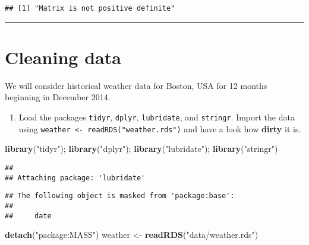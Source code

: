\documentclass[]{article}
\newenvironment{Shaded}{\begin{snugshade}}{\end{snugshade}}
\newcommand{\KeywordTok}[1]{\textcolor[rgb]{0.13,0.29,0.53}{\textbf{#1}}}
\newcommand{\StringTok}[1]{\textcolor[rgb]{0.31,0.60,0.02}{#1}}
\newcommand{\NormalTok}[1]{#1}
\providecommand{\tightlist}{%
  \setlength{\itemsep}{0pt}\setlength{\parskip}{0pt}}
\begin{document}
\begin{verbatim}
## [1] "Matrix is not positive definite"
\end{verbatim}

\begin{center}\rule{0.5\linewidth}{\linethickness}\end{center}

\section{Cleaning data}\label{cleaning-data}

We will consider historical weather data for Boston, USA for 12 months
beginning in December 2014.

\begin{enumerate}
\def\labelenumi{\arabic{enumi}.}
\tightlist
\item
  Load the packages \texttt{tidyr}, \texttt{dplyr}, \texttt{lubridate},
  and \texttt{stringr}. Import the data using
  \texttt{weather\ \textless{}-\ readRDS("weather.rds")} and have a look
  how \textbf{dirty} it is.
\end{enumerate}

\begin{Shaded}
\begin{Highlighting}[]
\KeywordTok{library}\NormalTok{(}\StringTok{"tidyr"}\NormalTok{); }\KeywordTok{library}\NormalTok{(}\StringTok{"dplyr"}\NormalTok{); }\KeywordTok{library}\NormalTok{(}\StringTok{"lubridate"}\NormalTok{); }\KeywordTok{library}\NormalTok{(}\StringTok{"stringr"}\NormalTok{)}
\end{Highlighting}
\end{Shaded}

\begin{verbatim}
## 
## Attaching package: 'lubridate'
\end{verbatim}

\begin{verbatim}
## The following object is masked from 'package:base':
## 
##     date
\end{verbatim}

\begin{Shaded}
\begin{Highlighting}[]
\KeywordTok{detach}\NormalTok{(}\StringTok{"package:MASS"}\NormalTok{)}
\NormalTok{weather <-}\StringTok{ }\KeywordTok{readRDS}\NormalTok{(}\StringTok{"data/weather.rds"}\NormalTok{)}
\end{Highlighting}
\end{Shaded}
\end{document}
